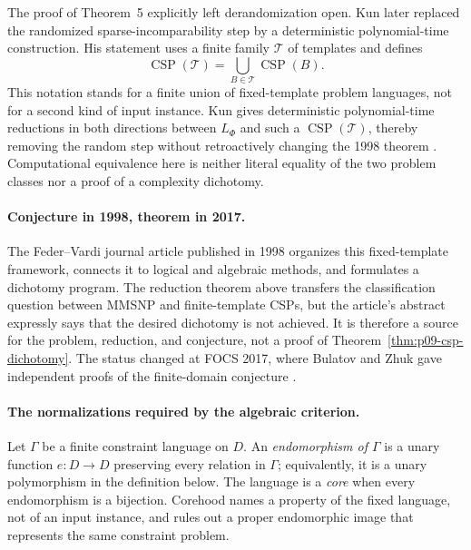 The proof of Theorem~5 explicitly left derandomization open.  Kun later
replaced the randomized sparse-incomparability step by a
deterministic polynomial-time construction.  His statement uses a finite
family \(\mathcal T\) of templates and defines
\[
 \operatorname{CSP}(\mathcal T)
   =\bigcup_{B\in\mathcal T}\operatorname{CSP}(B).
\]
This notation stands for a finite union of fixed-template problem languages,
not for a second kind of input instance.  Kun gives deterministic
polynomial-time reductions in both directions between \(L_\Phi\) and such a
\(\operatorname{CSP}(\mathcal T)\), thereby removing the random step without
retroactively changing the 1998 theorem \cite{Kun2013}.
Computational equivalence here is neither literal equality of the two problem
classes nor a proof of a complexity dichotomy.

\paragraph{Conjecture in 1998, theorem in 2017.}
The Feder--Vardi journal article published in 1998 organizes this fixed-template
framework, connects it to logical and algebraic methods, and formulates a
dichotomy program.  The reduction theorem above transfers the classification
question between MMSNP and finite-template CSPs, but the article's abstract
expressly says that the desired dichotomy is not achieved.  It is therefore a
source for the problem, reduction, and conjecture, not a proof of
Theorem~\ref{thm:p09-csp-dichotomy}.  The status changed at FOCS 2017, where
Bulatov and Zhuk gave independent proofs of the finite-domain conjecture
\cite{FederVardi1998,Bulatov2017,Zhuk2017}.

\paragraph{The normalizations required by the algebraic criterion.}
Let \(\Gamma\) be a finite constraint language on \(D\).  An
\emph{endomorphism of \(\Gamma\)} is a unary function \(e:D\to D\) preserving
every relation in \(\Gamma\); equivalently, it is a unary polymorphism in the
definition below.  The language is a \emph{core} when every endomorphism is a
bijection.  Corehood names a property of the fixed language, not of an input
instance, and rules out a proper endomorphic image that represents the same
constraint problem.

